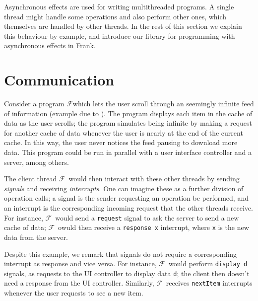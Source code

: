 \documentclass[msc,deptreport,cs]{infthesis} %
\newcommand{\code}[1]{\lstinline{#1}}
\newcommand\feed{$\mathcal{F}$}
\newcommand{\todo}[1]
           {{\par\noindent\small\color{RoyalPurple}
  \framebox{\parbox{\dimexpr\linewidth-2\fboxsep-2\fboxrule}
    {\textbf{TODO:} #1}}}}
\begin{document}
Asynchronous effects are used for writing multithreaded programs. A single
thread might handle some operations and also perform other ones, which
themselves are handled by other threads. In the rest of this section we explain
this behaviour by example, and introduce our library for programming with
asynchronous effects in Frank.

%


\section{Communication}

Consider a program \feed which lets the user scroll through an seemingly
infinite feed of information (example due to
\citeauthor{ahman2020asynchronous}). The program displays each item in the cache
of data as the user scrolls; the program simulates being infinite by making a
request for another cache of data whenever the user is nearly at the end of the
current cache. In this way, the user never notices the feed pausing to download
more data. This program could be run in parallel with a user interface
controller and a server, among others.

The client thread \feed~would then interact with these other threads by sending
\emph{signals} and receiving \emph{interrupts}. One can imagine these as a
further division of operation calls; a signal is the sender requesting an
operation be performed, and an interrupt is the corresponding incoming request
that the other threads receive. For instance, \feed~would send a \code{request}
signal to ask the server to send a new cache of data; \feed~owuld then receive a
\code{response x} interrupt, where \code{x} is the new data from the server.

Despite this example, we remark that signals do not require a corresponding
interrupt as response and vice versa.
%
For instance, \feed~would perform \code{display d} signals, as requests to the
UI controller to display data \code{d}; the client then doesn't need a response
from the UI controller. Similarly, \feed~receives \code{nextItem} interrupts
whenever the user requests to see a new item.



\end{document}
